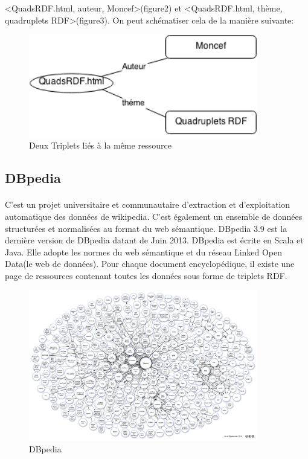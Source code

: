 <QuadsRDF.html, auteur, Moncef>(figure2) et <QuadsRDF.html, thème, quadruplets RDF>(figure3).
On peut schématiser cela de la manière suivante:
\begin{figure}[H]
        \centering
                \centering
                \includegraphics[width=10cm]{Diag.png}
               \caption{Deux Triplets liés à la même ressource}

\end{figure}

\subsection*{DBpedia}
\paragraph{}
C'est un projet universitaire et communautaire d’extraction et d’exploitation automatique des données de wikipedia. C’est également un ensemble de données structurées et normalisées au format du web sémantique.
DBpedia 3.9 est la dernière version de DBpedia datant de Juin 2013. DBpedia est écrite en Scala et Java.
Elle adopte les normes du web sémantique et du réseau Linked Open Data(le web de données). Pour chaque document encyclopédique, il existe une page de ressources contenant toutes les données sous forme de triplets RDF.
\begin{figure}[H]
        \centering
                \centering
                \includegraphics[width=10cm]{dbpedia.png}
               \caption{DBpedia}

\end{figure}
\newpage
